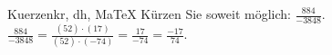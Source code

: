 \begin{MAufgabe}{Kuerzen}{kr, dh, MaTeX}
K\"urzen Sie soweit m\"oglich: $\frac{884}{-3848}$.\\ 
\ifLsg\MLoesung
\quad $\frac{884}{-3848}=\frac{(52)\cdot(17)}{(52)\cdot(-74)}=\frac{17}{-74}=\frac{-17}{74}$.\else\relax\fi
 \end{MAufgabe}